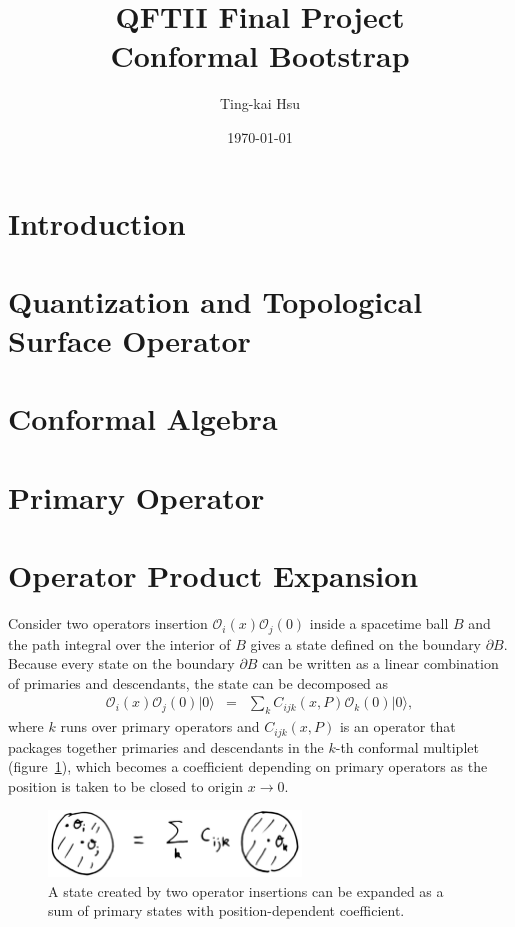 \documentclass[12pt]{article}
\title{QFTII Final Project\\Conformal Bootstrap}
\author{Ting-kai Hsu}
\date{\today}
\numberwithin{equation}{section}
\newcommand\be{\begin{eqnarray}}
\newcommand\ee{\end{eqnarray}}
\newcommand\cO{\mathcal{O}}
\newcommand\<\langle
\renewcommand\>\rangle
\renewcommand\.{\cdot}
\begin{document}
\maketitle
\tableofcontents
\begin{abstract}
    
\end{abstract}
\section{Introduction}
\section{Quantization and Topological Surface Operator}
\section{Conformal Algebra}
\section{Primary Operator}
\section{Operator Product Expansion}
Consider two operators insertion $\cO_i(x)\cO_j(0)$ inside a spacetime ball $B$ and the path integral over the interior of $B$ gives a state defined on the boundary $\partial B$.  Because every state on the boundary $\partial B$ can be written as a linear combination of primaries and descendants, the state can be decomposed as
\be
\label{eq:opeinitial}
\cO_i(x)\cO_j(0)|0\> &=& \sum_{k}C_{ijk}(x,P)\cO_k(0) |0\>,
\ee
where $k$ runs over primary operators and $C_{ijk}(x,P)$ is an operator that packages together primaries and descendants in the $k$-th conformal multiplet (figure~\ref{fig:ope}), which becomes a coefficient depending on primary operators as the position is taken to be closed to origin $x\rightarrow 0$.

\begin{figure}[H]
\begin{center}
\includegraphics[width=0.6\textwidth]{ope.jpg}
\end{center}
\caption{A state created by two operator insertions can be expanded as a sum of primary states with position-dependent coefficient.  
\label{fig:ope}}
\end{figure}
\end{document}
